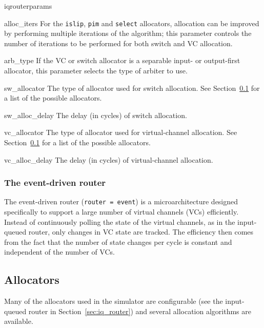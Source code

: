 \documentclass[11pt]{article}
\begin{document}
{\begin{opt_list}{iqrouterparams}
\item[alloc\_iters] For the \texttt{islip}, \texttt{pim} and
  \texttt{select} allocators, allocation can be improved by performing
  multiple iterations of the algorithm; this parameter controls the
  number of iterations to be performed for both switch and VC
  allocation. 

\item[arb\_type] If the VC or switch  allocator is a separable
  input- or output-first allocator, this parameter selects the type of
  arbiter to use. 

\item[sw\_allocator] The type of allocator used for switch
  allocation. See Section~\ref{sec:alloc} for a list of the possible
  allocators. 

\item[sw\_alloc\_delay] The delay (in cycles) of switch allocation.

\item[vc\_allocator] The type of allocator used for virtual-channel
allocation.  See Section~\ref{sec:alloc} for a list of the possible
allocators.

\item[vc\_alloc\_delay] The delay (in cycles) of virtual-channel
allocation.

\end{opt_list}

\subsubsection{The event-driven router}
\label{sec:event_router}

The event-driven router (\texttt{router = event}) is a
microarchitecture designed specifically to support a large number of
virtual channels (VCs) efficiently.  Instead of continuously polling
the state of the virtual channels, as in the input-queued router, only
changes in VC state are tracked.  The efficiency then comes from the
fact that the number of state changes per cycle is constant and
independent of the number of VCs.

\subsection{Allocators}
\label{sec:alloc}

Many of the allocators used in the simulator are configurable (see
the input-queued router in Section~\ref{sec:iq_router}) and several
allocation algorithms are available.

}
\end{document}

